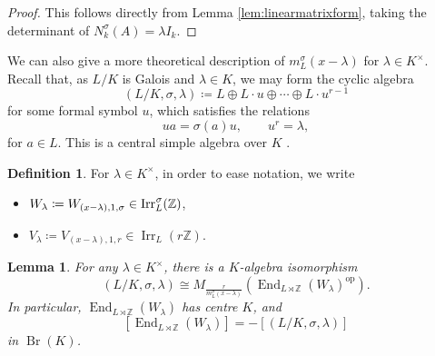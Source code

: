 \documentclass[10pt, reqno, hidelinks]{amsart}
\DeclareMathOperator{\opp}{op}
\DeclareMathOperator{\Br}{Br}
\DeclareMathOperator{\End}{End}
\DeclareMathOperator{\Irr}{Irr}
\newcommand{\bZ}{{\mathbb Z}}
\numberwithin{thm}{subsection}
\newtheorem{lemma}[thm]{Lemma}
\theoremstyle{definition}
\newtheorem{defn}[thm]{Definition}
\begin{document}
\begin{proof}
    This follows directly from Lemma \ref{lem:linearmatrixform}, taking the determinant of $N_{k}^{\sigma}(A) = \lambda I_k$.
\end{proof}

We can also give a more theoretical description of $m_L^{\sigma}(x-\lambda)$ for $\lambda \in K^{\times}$. Recall that, as $L / K$ is Galois and $\lambda \in K$, we may form the cyclic algebra
\[
(L/K, \sigma, \lambda) \coloneqq L \oplus L \cdot u \oplus \cdots \oplus L \cdot u^{r-1}
\]
for some formal symbol $u$, which satisfies the relations
\[
u a = \sigma(a) u, \qquad u^r = \lambda,
\]
for $a \in L$. This is a central simple algebra over $K$ \cite[Thm.\ 14.6]{LAM}. 

\begin{defn}
    For $\lambda \in K^{\times}$, in order to ease notation, we write
    \begin{itemize}
    	\item $W_{\lambda} \coloneqq W_{(x-\lambda), 1, \sigma} \in \Irr_L^{\hspace{0.05em}  \sigma}(\bZ)$,
    	\item $V_{\lambda} \coloneqq V_{(x-\lambda), 1, r} \in \Irr_L(r\bZ)$.
    \end{itemize}
\end{defn}

\begin{lemma}\label{lem:linearbrauerequiv}
    For any $\lambda \in K^{\times}$, there is a $K$-algebra isomorphism
    \[
    (L/K, \sigma, \lambda) \cong M_{\frac{r}{m_L^{\sigma}(x-\lambda)}}(\End_{L \rtimes \bZ}(W_{\lambda})^{\opp}).
    \]
    In particular, $\End_{L \rtimes \bZ}(W_{\lambda})$ has centre $K$, and
    \[
    [\End_{L \rtimes \bZ}(W_{\lambda})] = - [(L/K, \sigma, \lambda)]
    \]
    in $\Br(K)$.
\end{lemma}
\end{document}
